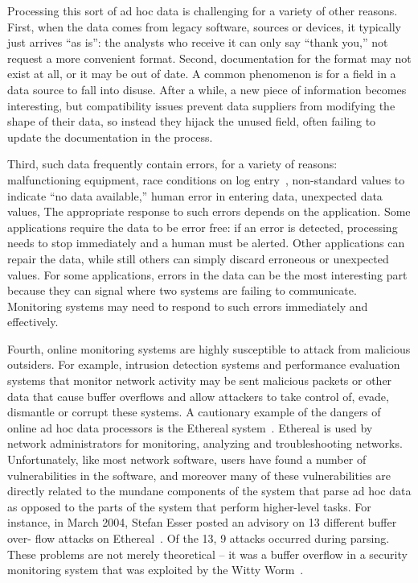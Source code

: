 Processing this sort of 
ad hoc data is challenging for a variety of other reasons. 
First, when the data comes from legacy software, sources or devices, it 
typically just arrives ``as is'': the analysts
who receive it can only say ``thank you,'' not request a more
convenient format.  Second, documentation for the format may not exist
at all, or it may be out of date.  A common phenomenon is for a field
in a data source to fall into disuse.  After a while, a new piece of
information becomes interesting, but compatibility issues prevent data
suppliers from modifying the shape of their data, so instead they
hijack the unused field, often failing to update the documentation in
the process.

Third, such data frequently contain errors, for a variety of reasons:
malfunctioning equipment, race conditions on log entry~\cite{wpp},
non-standard values to indicate ``no data available,'' human error in
entering data, unexpected data values, \etc{} The appropriate response
to such errors depends on the application.  Some applications require
the data to be error free: if an error is detected, processing needs
to stop immediately and a human must be alerted.  Other applications
can repair the data, while still others can simply discard erroneous
or unexpected values.  For some applications, errors in the data can
be the most interesting part because they can signal where two systems
are failing to communicate.  Monitoring systems may need to respond to such
errors immediately and effectively.

Fourth, online monitoring systems
are highly susceptible to attack from malicious outsiders.
For example, intrusion detection systems
and performance evaluation systems that monitor network activity 
may be sent malicious packets or other data that cause buffer overflows
and allow attackers to take control of, evade, dismantle or corrupt these
systems.  A cautionary example of the dangers of online ad hoc data
processors is the Ethereal system~\cite{ethereal}. Ethereal is used by network administrators for monitoring, analyzing
and troubleshooting networks. Unfortunately, like most network software, users have found a number of
vulnerabilities in the software, and moreover many of these vulnerabilities are directly related to the mundane
components of the system that parse ad hoc data as opposed to the parts of the system that perform
higher-level tasks. For instance, in March 2004, Stefan Esser posted an advisory on 13 different buffer over-
flow attacks on Ethereal~\cite{etherealvulnerabilities}. Of the 13, 9 attacks occurred during parsing. These problems are not merely theoretical -- it was
a buffer overflow in a security monitoring system that was exploited by the
Witty Worm~\cite{witty}.


